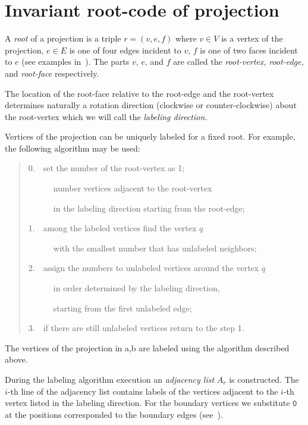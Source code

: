 \documentclass[12pt]{article}
\begin{document}
\section{Invariant root-code of projection}

\begin{dfn} A {\it root\/} of a projection is a triple $r=(v,e,f)$ where $v\in V$ is a
vertex of the projection, $e\in E$ is one of four edges incident to $v$, $f$ is one of two faces
incident to $e$ (see examples in~). The parts $v$, $e$, and $f$ are called
the {\it root-vertex,} {\it root-edge,} and {\it root-face\/} respectively.\end{dfn}

The location of the root-face relative to the root-edge and the root-vertex determines naturally
a rotation direction (clockwise or counter-clockwise) about the root-vertex which we will call
the {\it labeling direction.}

Vertices of the projection can be uniquely labeled for a fixed root. For example, the following
algorithm may be used:
\begin{quote}\parskip=0mm\ttfamily\footnotesize

0.~~set the number of the root-vertex as 1;

~~~~~~number vertices adjacent to the root-vertex

~~~~~~in the labeling direction starting from the root-edge;

1.~~among the labeled vertices find the vertex $q$

~~~~~~with the smallest number that has unlabeled neighbors;

2.~~assign the numbers to unlabeled vertices around the vertex $q$

~~~~~~in order determined by the labeling direction,

~~~~~~starting from the first unlabeled edge;

3.~~if there are still unlabeled vertices return to the step 1.
\end{quote}

\noindent The vertices of the projection in a,b are labeled using the
algorithm described above.


During the labeling algorithm execution an \emph{adjacency list\/} $A_r$ is constructed. The
$i$-th line of the adjacency list contains labels of the vertices adjacent to the $i$-th vertex
listed in the labeling direction. For the boundary vertices we substitute $\mathtt{0}$ at the
positions corresponded to the boundary edges (see~).
\end{document}
